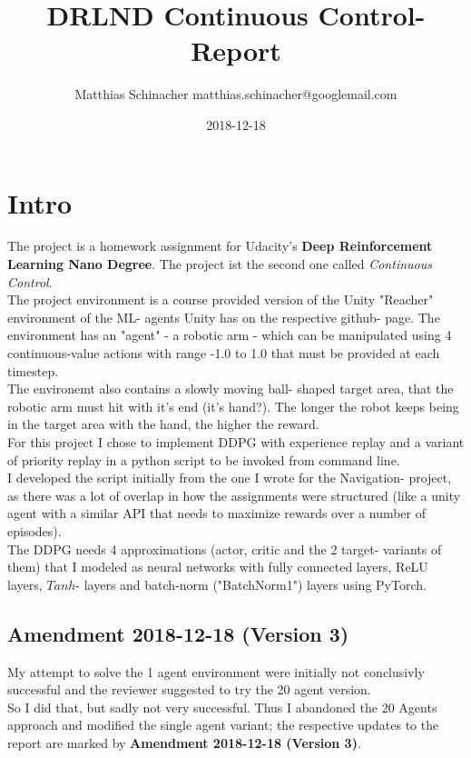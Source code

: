 \documentclass[a4paper]{article}
\title{DRLND Continuous Control- Report}
\date{2018-12-18}
\author{Matthias Schinacher matthias.schinacher@googlemail.com}
\begin{document}
\maketitle
\tableofcontents
\newpage

\section{Intro}
The project is a homework assignment for Udacity's \textbf{Deep Reinforcement Learning Nano Degree}.
The project ist the second one called \textit{Continuous Control}.
\\
The project environment is a course provided version of the Unity "Reacher"
environment of the ML- agents Unity has on the respective github- page.
The environment has an "agent" - a robotic arm - which can be manipulated
using 4 continuous-value actions with range -1.0 to 1.0 that must be provided
at each timestep.
\\
The environemt also contains a slowly moving ball- shaped target area,
that the robotic arm must hit with it's end (it's hand?).
The longer the robot keeps being in the target area with the hand,
the higher the reward.
\\
For this project I chose to implement DDPG with experience replay and
a variant of priority replay in a python script to be invoked from command line.
\\
I developed the script initially from the one I wrote for the Navigation- project,
as there was a lot of overlap in how the assignments were structured (like
a unity agent with a similar API that needs to maximize rewards over a
number of episodes).
\\
The DDPG needs 4 approximations (actor, critic and the 2 target- variants of them)
that I modeled as neural networks with fully connected layers, ReLU layers,
$Tanh$- layers and batch-norm ("BatchNorm1") layers using PyTorch.

\subsection{Amendment 2018-12-18 (Version 3)}
My attempt to solve the 1 agent environment were initially not conclusivly successful
and the reviewer suggested to try the 20 agent version.
\\
So I did that, but sadly not very successful. Thus I abandoned the 20 Agents
approach and modified the single agent variant; the respective updates
to the report are marked by \textbf{Amendment 2018-12-18 (Version 3)}.
\end{document}

